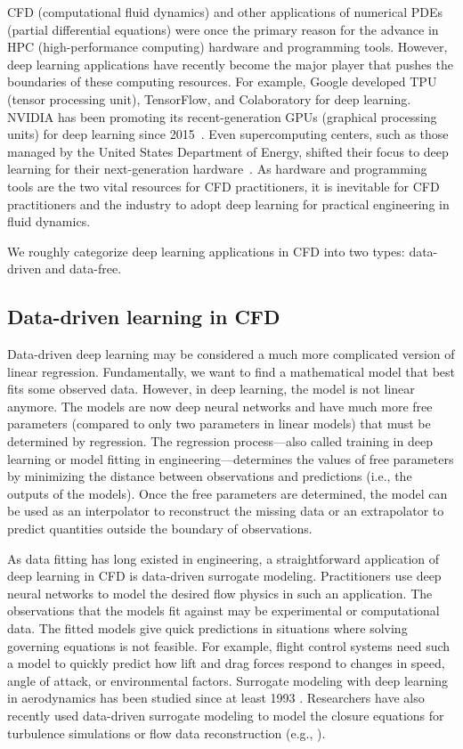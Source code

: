
CFD (computational fluid dynamics) and other applications of numerical PDEs (partial differential equations) were once the primary reason for the advance in HPC (high-performance computing) hardware and programming tools.
However, deep learning applications have recently become the major player that pushes the boundaries of these computing resources.
For example, Google developed TPU (tensor processing unit), TensorFlow, and Colaboratory for deep learning.
NVIDIA has been promoting its recent-generation GPUs (graphical processing units) for deep learning since 2015~\cite{buck_nvidias_2015}.
Even supercomputing centers, such as those managed by the United States Department of Energy, shifted their focus to deep learning for their next-generation hardware~\cite{us_department_of_energy_argonne_2019}.
As hardware and programming tools are the two vital resources for CFD practitioners, it is inevitable for CFD practitioners and the industry to adopt deep learning for practical engineering in fluid dynamics.

We roughly categorize deep learning applications in CFD into two types: data-driven and data-free.

\subsection*{Data-driven learning in CFD}

Data-driven deep learning may be considered a much more complicated version of linear regression.
Fundamentally, we want to find a mathematical model that best fits some observed data.
However, in deep learning, the model is not linear anymore.
The models are now deep neural networks and have much more free parameters (compared to only two parameters in linear models) that must be determined by regression.
The regression process---also called training in deep learning or model fitting in engineering---determines the values of free parameters by minimizing the distance between observations and predictions (i.e., the outputs of the models).
Once the free parameters are determined, the model can be used as an interpolator to reconstruct the missing data or an extrapolator to predict quantities outside the boundary of observations.

As data fitting has long existed in engineering, a straightforward application of deep learning in CFD is data-driven surrogate modeling.
Practitioners use deep neural networks to model the desired flow physics in such an application.
The observations that the models fit against may be experimental or computational data.
The fitted models give quick predictions in situations where solving governing equations is not feasible.
For example, flight control systems need such a model to quickly predict how lift and drag forces respond to changes in speed, angle of attack, or environmental factors. 
Surrogate modeling with deep learning in aerodynamics has been studied since at least 1993 \cite{linse_identification_1993, faller_unsteady_1997}.
Researchers have also recently used data-driven surrogate modeling to model the closure equations for turbulence simulations or flow data reconstruction (e.g., \cite{Tracey2015,milano_neural_2002}).

